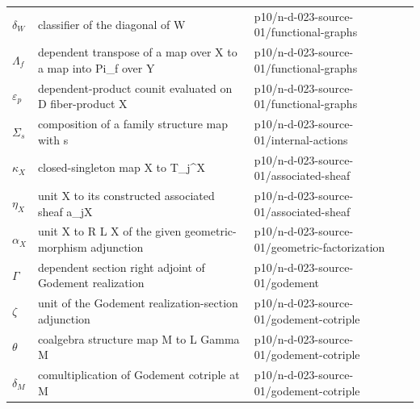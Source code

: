 \begin{longtable}{@{}p{}p{}p{}@{}}
\(\delta_W\) & classifier of the diagonal of W & p10/\allowbreak{}n-\allowbreak{}d-\allowbreak{}023-\allowbreak{}source-\allowbreak{}01/\allowbreak{}functional-\allowbreak{}graphs \\
\(\Lambda_f\) & dependent transpose of a map over X to a map into Pi\_f over Y & p10/\allowbreak{}n-\allowbreak{}d-\allowbreak{}023-\allowbreak{}source-\allowbreak{}01/\allowbreak{}functional-\allowbreak{}graphs \\
\(\varepsilon_p\) & dependent-product counit evaluated on D fiber-product X & p10/\allowbreak{}n-\allowbreak{}d-\allowbreak{}023-\allowbreak{}source-\allowbreak{}01/\allowbreak{}functional-\allowbreak{}graphs \\
\(\Sigma_s\) & composition of a family structure map with s & p10/\allowbreak{}n-\allowbreak{}d-\allowbreak{}023-\allowbreak{}source-\allowbreak{}01/\allowbreak{}internal-\allowbreak{}actions \\
\(\kappa_X\) & closed-singleton map X to T\_j\^{}X & p10/\allowbreak{}n-\allowbreak{}d-\allowbreak{}023-\allowbreak{}source-\allowbreak{}01/\allowbreak{}associated-\allowbreak{}sheaf \\
\(\eta_X\) & unit X to its constructed associated sheaf a\_jX & p10/\allowbreak{}n-\allowbreak{}d-\allowbreak{}023-\allowbreak{}source-\allowbreak{}01/\allowbreak{}associated-\allowbreak{}sheaf \\
\(\alpha_X\) & unit X to R L X of the given geometric-morphism adjunction & p10/\allowbreak{}n-\allowbreak{}d-\allowbreak{}023-\allowbreak{}source-\allowbreak{}01/\allowbreak{}geometric-\allowbreak{}factorization \\
\(\Gamma\) & dependent section right adjoint of Godement realization & p10/\allowbreak{}n-\allowbreak{}d-\allowbreak{}023-\allowbreak{}source-\allowbreak{}01/\allowbreak{}godement \\
\(\zeta\) & unit of the Godement realization-section adjunction & p10/\allowbreak{}n-\allowbreak{}d-\allowbreak{}023-\allowbreak{}source-\allowbreak{}01/\allowbreak{}godement-\allowbreak{}cotriple \\
\(\theta\) & coalgebra structure map M to L Gamma M & p10/\allowbreak{}n-\allowbreak{}d-\allowbreak{}023-\allowbreak{}source-\allowbreak{}01/\allowbreak{}godement-\allowbreak{}cotriple \\
\(\delta_M\) & comultiplication of Godement cotriple at M & p10/\allowbreak{}n-\allowbreak{}d-\allowbreak{}023-\allowbreak{}source-\allowbreak{}01/\allowbreak{}godement-\allowbreak{}cotriple \\

\end{longtable}
